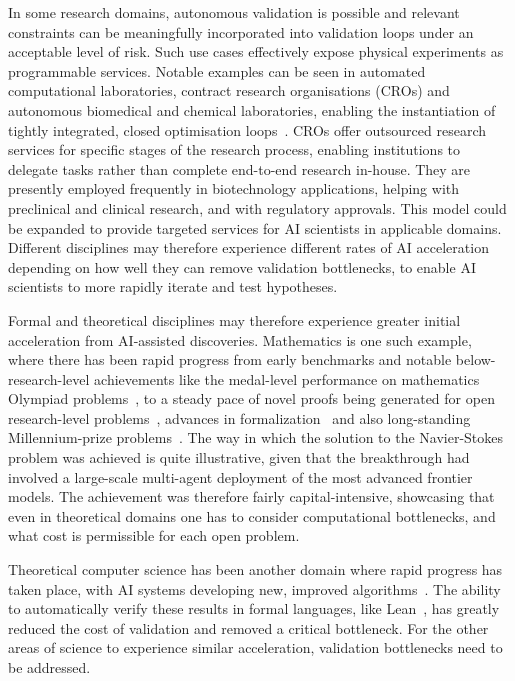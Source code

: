 \documentclass[11pt, a4paper, twocolumn, goog]{google}
\begin{document}
In some research domains, autonomous validation is possible and relevant constraints can be meaningfully incorporated into validation loops under an acceptable level of risk. Such use cases effectively expose physical experiments as programmable services. Notable examples can be seen in automated computational laboratories, contract research organisations (CROs) and autonomous biomedical and chemical laboratories, enabling the instantiation of tightly integrated, closed optimisation loops~\citep{mirowski2005contract, seifrid2022autonomous, szymanski2023autonomous, ha2023ai, tom2024self, dai2024autonomous, lunt2024modular, bayley2024autonomous, duo2025autonomous, fushimi2025development}. CROs offer outsourced research services for specific stages of the research process, enabling institutions to delegate tasks rather than complete end-to-end research in-house. They are presently employed frequently in biotechnology applications, helping with preclinical and clinical research, and with regulatory approvals. This model could be expanded to provide targeted services for AI scientists in applicable domains. Different disciplines may therefore experience different rates of AI acceleration depending on how well they can remove validation bottlenecks, to enable AI scientists to more rapidly iterate and test hypotheses.

Formal and theoretical disciplines may therefore experience greater initial acceleration from AI-assisted discoveries. Mathematics is one such example, where there has been rapid progress from early benchmarks and notable below-research-level achievements like the medal-level performance on mathematics Olympiad problems~\citep{chervonyi2025gold, hubert2025olympiad}, to a steady pace of novel proofs being generated for open research-level problems~\citep{feng2026towards, feng2026semiautonomousmathematicsdiscoverygemini, tao2026mathematicsageai}, advances in formalization~\citep{anthropic2026formal} and also long-standing Millennium-prize problems~\citep{nsoai}. The way in which the solution to the Navier-Stokes problem was achieved is quite illustrative, given that the breakthrough had involved a large-scale multi-agent deployment of the most advanced frontier models. The achievement was therefore fairly capital-intensive, showcasing that even in theoretical domains one has to consider computational bottlenecks, and what cost is permissible for each open problem.

Theoretical computer science has been another domain where rapid progress has taken place, with AI systems developing new, improved algorithms~\citep{fawzi2022discovering, novikov2025alphaevolvecodingagentscientific}. The ability to automatically verify these results in formal languages, like Lean~\citep{moura2021lean, ying2024lean}, has greatly reduced the cost of validation and removed a critical bottleneck. For the other areas of science to experience similar acceleration, validation bottlenecks need to be addressed.
\end{document}
